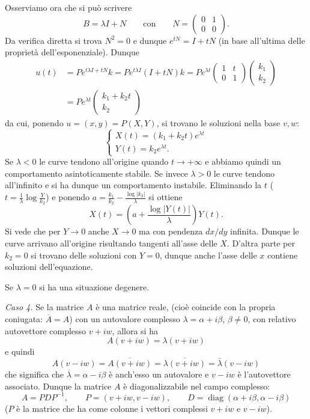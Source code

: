 \documentclass[italian,a4paper]{scrartcl}
\DeclareMathOperator{\diag}{diag}
\begin{document}
Osserviamo ora che si può scrivere 
\[
B = \lambda I + N \qquad\text{con}\qquad N=\begin{pmatrix}0&1\\0 & 0\end{pmatrix}.
\]
Da verifica diretta si trova $N^2=0$ e dunque $e^{tN} = I + tN$ (in base
all'ultima delle proprietà dell'esponenziale). Dunque
\begin{align*}
u(t) &= P e^{t\lambda I + tN}k = P e^{t\lambda I} (I + t N)k =
P e^{\lambda t} \begin{pmatrix} 1 & t \\ 0 & 1\end{pmatrix}\begin{pmatrix}k_1\\k_2\end{pmatrix}\\
& = P e^{\lambda t}\begin{pmatrix}k_1 + k_2 t \\ k_2\end{pmatrix}
\end{align*}
da cui, ponendo $u=(x,y) = P(X,Y)$, si trovano le soluzioni nella base
$v,w$:
\[
\begin{cases}
X(t) = (k_1 + k_2 t) e^{\lambda t}\\
Y(t) = k_2 e^{\lambda t}.
\end{cases}
\]
Se $\lambda<0$ le curve tendono all'origine quando $t\to +\infty$ e
abbiamo quindi un comportamento asintoticamente stabile. Se invece
$\lambda>0$ le curve tendono all'infinito e si ha dunque un
comportamento instabile. 
Eliminando la $t$ ($t=\frac 1 \lambda \log\frac Y {k_2}$) e ponendo $a
= \frac{k_1}{k_2} - \frac{\log|k_2|}{\lambda}$ si ottiene 
\[
X(t) = \left(a+\frac{\log|Y(t)|}{\lambda}\right)Y(t).
\]
Si vede che per $Y\to 0$ anche $X\to 0$ ma con pendenza $dx/dy$
infinita. Dunque le curve arrivano all'origine risultando tangenti
all'asse delle $X$. D'altra parte per $k_2=0$ si trovano delle
soluzioni con $Y=0$, dunque anche l'asse delle $x$ contiene soluzioni
dell'equazione.

Se $\lambda=0$ si ha una situazione degenere.

\emph{Caso 4.}
Se la matrice $A$ è una matrice reale, (cioè coincide con la propria
coniugata: $\overline A=A$) con un autovalore complesso $\lambda =
\alpha + i\beta$, $\beta\neq 0$, con relativo autovettore complesso
$v+iw$, allora si ha 
\[
  A(v+iw) = \lambda(v+iw)
\]
e quindi
\[
  A(v-iw) = \overline{A(v+iw)} = \overline{\lambda(v+iw)} = \bar \lambda (v-iw)
\]
che significa che $\overline \lambda = \alpha-i\beta$ è anch'esso un autovalore e $v-iw$ è l'autovettore associato. Dunque la matrice $A$ è diagonalizzabile nel campo complesso:
\[
  A = P D P^{-1},\qquad P=(v+iw, v-iw),\qquad D = \diag(\alpha+i\beta, \alpha-i\beta)
\]
($P$ è la matrice che ha come colonne i vettori complessi $v+iw$ e
$v-iw$).
\end{document}

